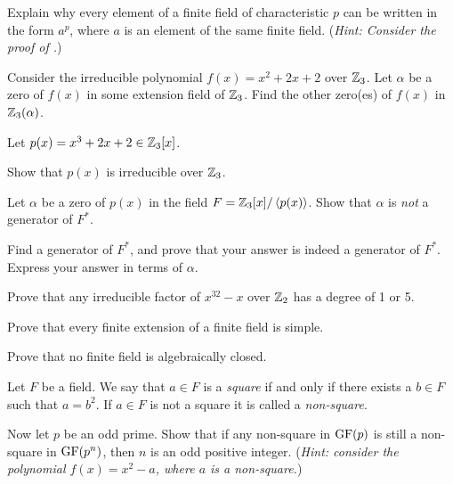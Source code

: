 \begin{problem}
    Explain why every element of a finite field of characteristic $p$ can be written in the form $a^p$, where $a$ is an element of the same finite field.
    (\textit{Hint: Consider the proof of .})
\end{problem}

\begin{problem}
    Consider the irreducible polynomial $f(x) = x^2 + 2x + 2$ over $\mathbb{Z}_3$. Let $\alpha$ be a zero of $f(x)$ in some extension field of $\mathbb{Z}_3$. Find the other zero(es) of $f(x)$ in $\mathbb{Z}_3(\alpha)$.
\end{problem}

\begin{problem}\label{problem-zero-of-irreducible-in-finite-field-is-not-generator}
    Let $p(x) = x^3 + 2x + 2 \in \mathbb{Z}_3[x]$.
    \begin{partquestions}{\roman*}
        \item Show that $p(x)$ is irreducible over $\mathbb{Z}_3$.
        \item Let $\alpha$ be a zero of $p(x)$ in the field $F = \mathbb{Z}_3[x]/\left\langle p(x)\right\rangle$. Show that $\alpha$ is \textit{not} a generator of $F^\ast$.
        \item Find a generator of $F^\ast$, and prove that your answer is indeed a generator of $F^\ast$. Express your answer in terms of $\alpha$.
    \end{partquestions}
\end{problem}

\begin{problem}
    Prove that any irreducible factor of $x^{32} - x$ over $\mathbb{Z}_2$ has a degree of 1 or 5.
\end{problem}

\begin{problem}
    Prove that every finite extension of a finite field is simple.
\end{problem}

\begin{problem}
    Prove that no finite field is algebraically closed.
\end{problem}

\begin{problem}
    Let $F$ be a field. We say that $a \in F$ is a \textit{square} if and only if there exists a $b \in F$ such that $a = b^2$. If $a \in F$ is not a square it is called a \textit{non-square}.

    Now let $p$ be an odd prime. Show that if any non-square in $\mathrm{GF}(p)$ is still a non-square in $\mathrm{GF}(p^n)$, then $n$ is an odd positive integer.\newline
    (\textit{Hint: consider the polynomial $f(x) = x^2-a$, where $a$ is a non-square.})
\end{problem}
